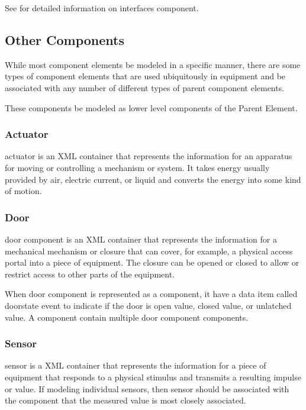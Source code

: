 \documentclass{mtconnect}	%
\begin{document}
See  for detailed information on \gls{interfaces component}.

\subsection{Other Components}

While most component elements \should be modeled in a specific manner, there are some types of component elements that are used ubiquitously in equipment and \may be associated with any number of different types of parent component elements.

These components \may be modeled as \gls{lower level} components of the Parent Element.

\subsubsection{Actuator}

\gls{actuator} is an XML container that represents the information for an apparatus for moving or controlling a mechanism or system.  It takes energy usually provided by air, electric current, or liquid and converts the energy into some kind of motion.  

\subsubsection{Door}

\gls{door component} is an XML container that represents the information for a mechanical mechanism or closure that can cover, for example, a physical access portal into a piece of equipment.  The closure can be opened or closed to allow or restrict access to other parts of the equipment.

When \gls{door component} is represented as a \gls{component}, it \must have a data item called \gls{doorstate event} to indicate if the door is \gls{open value}, \gls{closed value}, or \gls{unlatched value}.  A \gls{component} \may contain multiple \gls{door component} components.

\subsubsection{Sensor}
\label{sec:Sensor}

\gls{sensor} is a XML container that represents the information for a piece of equipment that responds to a physical stimulus and transmits a resulting impulse or value.  If modeling individual sensors, then sensor should be associated with the component that the measured value is most closely associated.   
\end{document}
